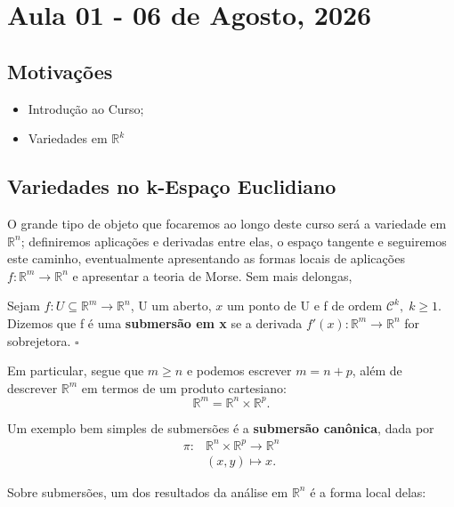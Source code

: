 \documentclass[../differential_topology.tex]{subfiles}
\begin{document}
\section{Aula 01 - 06 de Agosto, 2026}
\subsection{Motivações}
\begin{itemize}
	\item Introdução ao Curso;
	\item Variedades em \(\mathbb{R}^{k}\)
\end{itemize}
\subsection{Variedades no k-Espaço Euclidiano}
O grande tipo de objeto que focaremos ao longo deste curso será a variedade em \(\mathbb{R}^{n}\); definiremos aplicações e derivadas entre elas, o espaço tangente e seguiremos este caminho, eventualmente apresentando as formas locais de aplicações \(f:\mathbb{R}^{m}\rightarrow \mathbb{R}^{n}\) e apresentar a teoria de Morse.
Sem mais delongas,

\begin{def*}
	Sejam \(f:U \subseteq \mathbb{R}^{m}\rightarrow \mathbb{R}^{n}\), U um aberto, \(x\) um ponto de U e f de ordem \(\mathcal{C}^{k},\; k\geq 1\). Dizemos que f é uma \textbf{submersão em x} se a derivada \(f'(x):\mathbb{R}^{m}\rightarrow \mathbb{R}^{n}\) for sobrejetora. \(\square\)
\end{def*}

Em particular, segue que \(m \geq n\) e podemos escrever \(m = n + p\), além de descrever \(\mathbb{R}^{m}\) em termos de um produto cartesiano:
\[
	\mathbb{R}^{m} = \mathbb{R}^{n}\times \mathbb{R}^{p}.
\]
\begin{example}
	Um exemplo bem simples de submersões é a \textbf{submersão canônica}, dada por
	\begin{align*}
		\pi : & \mathbb{R}^{n}\times \mathbb{R}^{p}\rightarrow \mathbb{R}^{n} \\
		      & (x, y)\longmapsto x.
	\end{align*}
\end{example}
Sobre submersões, um dos resultados da análise em \(\mathbb{R}^{n}\) é a forma local delas:
\end{document}
